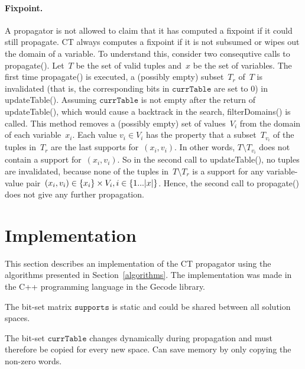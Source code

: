 \documentclass[a4paper,11pt]{article}
\newcommand{\Chapref}[1]{Section~\ref{#1}}
\newcommand{\CurrTable}{\texttt{currTable}}
\newcommand{\Supports}{\texttt{supports}}
\numberwithin{equation}{section}
\begin{document}
\paragraph{Fixpoint.}
A propagator is not allowed to claim that it has computed a fixpoint if
it could still propagate.
CT always computes a fixpoint if it is not subsumed or wipes out the domain of a variable.
To understand this, consider two consequtive calls to propagate().
Let~$T$ be the set of valid tuples and~$x$ be the set of variables.
The first time propagate() is executed, a (possibly empty) subset~$T_r$ of~$T$
is invalidated (that is, the corresponding bits in $\CurrTable$ are set to $0$)
in updateTable().
Assuming $\CurrTable$ is not empty after the return of updateTable(), which would
cause a backtrack in the search, filterDomains() is called.
This method removes a (possibly empty) set of values~$V_i$ from the domain 
of each variable~$x_i$.
Each value $v_i \in V_i$ has the property that a subset~$T_{v_i}$ 
of the tuples in~$T_r$ are the last supports for~$(x_i,v_i)$. In other words,
$T \setminus T_{v_i}$ does not contain a support for~$(x_i,v_i)$.
So in the second call to updateTable(), no tuples are invalidated,
because none of the tuples in~$T \setminus T_r$ is a support for any variable-value
pair~$(x_i, v_i) \in \left\{x_i\right\} \times V_i, i \in \left\{1...|x|\right\}$.
Hence, the second call to propagate() does not give
any further propagation.

\section{Implementation}
\label{implementation}


This section describes an implementation of the CT propagator using the algorithms
presented in \Chapref{algorithms}. The implementation was made in the C++ programming
language in the Gecode library.

The bit-set matrix $\Supports$ is static and could be shared between all solution spaces.

The bit-set $\CurrTable$ changes dynamically during propagation and must therefore be copied for
every new space. Can save memory by only copying the non-zero words.
\end{document}
